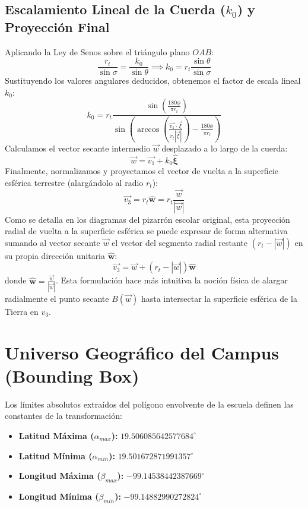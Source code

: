\documentclass[12pt,a4paper]{article}
\begin{document}
\subsection{Escalamiento Lineal de la Cuerda ($k_0$) y Proyección Final}
Aplicando la Ley de Senos sobre el triángulo plano $OAB$:
\begin{equation}
    \frac{r_t}{\sin \sigma} = \frac{k_0}{\sin \theta} \implies k_0 = r_t \frac{\sin \theta}{\sin \sigma}
\end{equation}
Sustituyendo los valores angulares deducidos, obtenemos el factor de escala lineal $k_0$:
\begin{equation}
    k_0 = r_t \frac{\sin \left( \frac{180 \phi}{\pi r_t} \right)}{\sin \left( \arccos \left( \frac{\vec{v_1} \cdot \vec{\xi}}{r_t |\vec{\xi}|} \right) - \frac{180 \phi}{\pi r_t} \right)}
\end{equation}
Calculamos el vector secante intermedio $\vec{w}$ desplazado a lo largo de la cuerda:
\begin{equation}
    \vec{w} = \vec{v_1} + k_0 \mathbf{\hat{\xi}}
\end{equation}
Finalmente, normalizamos y proyectamos el vector de vuelta a la superficie esférica terrestre (alargándolo al radio $r_t$):
\begin{equation}
    \vec{v_3} = r_t \mathbf{\hat{w}} = r_t \frac{\vec{w}}{|\vec{w}|}
\end{equation}
Como se detalla en los diagramas del pizarrón escolar original, esta proyección radial de vuelta a la superficie esférica se puede expresar de forma alternativa sumando al vector secante $\vec{w}$ el vector del segmento radial restante $(r_t - |\vec{w}|)$ en su propia dirección unitaria $\mathbf{\hat{w}}$:
\begin{equation}
    \vec{v_3} = \vec{w} + (r_t - |\vec{w}|) \mathbf{\hat{w}}
\end{equation}
donde $\mathbf{\hat{w}} = \frac{\vec{w}}{|\vec{w}|}$. Esta formulación hace más intuitiva la noción física de alargar radialmente el punto secante $B(\vec{w})$ hasta intersectar la superficie esférica de la Tierra en $v_3$.

\section{Universo Geográfico del Campus (Bounding Box)}

Los límites absolutos extraídos del polígono envolvente de la escuela definen las constantes de la transformación:
\begin{itemize}
    \item \textbf{Latitud Máxima ($\alpha_{max}$):} $19.506085642577684^\circ$
    \item \textbf{Latitud Mínima ($\alpha_{min}$):} $19.501672871991357^\circ$
    \item \textbf{Longitud Máxima ($\beta_{max}$):} $-99.14538442387669^\circ$
    \item \textbf{Longitud Mínima ($\beta_{min}$):} $-99.14882990272824^\circ$
\end{itemize}
\end{document}
